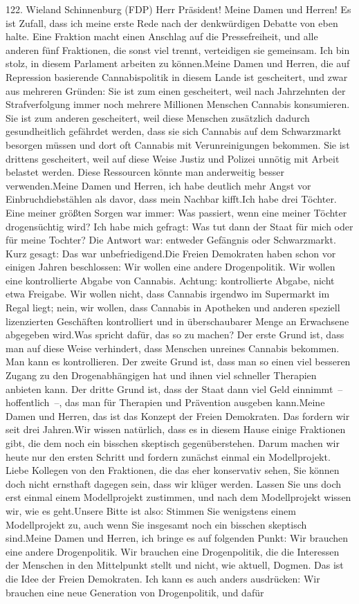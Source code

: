 \documentclass{article}
\begin{document}
	122. Wieland Schinnenburg (FDP) Herr Präsident! Meine Damen und Herren! Es ist Zufall, dass ich meine erste Rede nach der denkwürdigen Debatte von eben halte. Eine Fraktion macht einen Anschlag auf die Pressefreiheit, und alle anderen fünf Fraktionen, die sonst viel trennt, verteidigen sie gemeinsam. Ich bin stolz, in diesem Parlament arbeiten zu können.Meine Damen und Herren, die auf Repression basierende Cannabispolitik in diesem Lande ist gescheitert, und zwar aus mehreren Gründen: Sie ist zum einen gescheitert, weil nach Jahrzehnten der Strafverfolgung immer noch mehrere Millionen Menschen Cannabis konsumieren. Sie ist zum anderen gescheitert, weil diese Menschen zusätzlich dadurch gesundheitlich gefährdet werden, dass sie sich Cannabis auf dem Schwarzmarkt besorgen müssen und dort oft Cannabis mit Verunreinigungen bekommen. Sie ist drittens gescheitert, weil auf diese Weise Justiz und Polizei unnötig mit Arbeit belastet werden. Diese Ressourcen könnte man anderweitig besser verwenden.Meine Damen und Herren, ich habe deutlich mehr Angst vor Einbruchdiebstählen als davor, dass mein Nachbar kifft.Ich habe drei Töchter. Eine meiner größten Sorgen war immer: Was passiert, wenn eine meiner Töchter drogensüchtig wird? Ich habe mich gefragt: Was tut dann der Staat für mich oder für meine Tochter? Die Antwort war: entweder Gefängnis oder Schwarzmarkt. Kurz gesagt: Das war unbefriedigend.Die Freien Demokraten haben schon vor einigen Jahren beschlossen: Wir wollen eine andere Drogenpolitik. Wir wollen eine kontrollierte Abgabe von Cannabis. Achtung: kontrollierte Abgabe, nicht etwa Freigabe. Wir wollen nicht, dass Cannabis irgendwo im Supermarkt im Regal liegt; nein, wir wollen, dass Cannabis in Apotheken und anderen speziell lizenzierten Geschäften kontrolliert und in überschaubarer Menge an Erwachsene abgegeben wird.Was spricht dafür, das so zu machen? Der erste Grund ist, dass man auf diese Weise verhindert, dass Menschen unreines Cannabis bekommen. Man kann es kontrollieren. Der zweite Grund ist, dass man so einen viel besseren Zugang zu den Drogenabhängigen hat und ihnen viel schneller Therapien anbieten kann. Der dritte Grund ist, dass der Staat dann viel Geld einnimmt – hoffentlich –, das man für Therapien und Prävention ausgeben kann.Meine Damen und Herren, das ist das Konzept der Freien Demokraten. Das fordern wir seit drei Jahren.Wir wissen natürlich, dass es in diesem Hause einige Fraktionen gibt, die dem noch ein bisschen skeptisch gegenüberstehen. Darum machen wir heute nur den ersten Schritt und fordern zunächst einmal ein Modellprojekt. Liebe Kollegen von den Fraktionen, die das eher konservativ sehen, Sie können doch nicht ernsthaft dagegen sein, dass wir klüger werden. Lassen Sie uns doch erst einmal einem Modellprojekt zustimmen, und nach dem Modellprojekt wissen wir, wie es geht.Unsere Bitte ist also: Stimmen Sie wenigstens einem Modellprojekt zu, auch wenn Sie insgesamt noch ein bisschen skeptisch sind.Meine Damen und Herren, ich bringe es auf folgenden Punkt: Wir brauchen eine andere Drogenpolitik. Wir brauchen eine Drogenpolitik, die die Interessen der Menschen in den Mittelpunkt stellt und nicht, wie aktuell, Dogmen. Das ist die Idee der Freien Demokraten. Ich kann es auch anders ausdrücken: Wir brauchen eine neue Generation von Drogenpolitik, und dafür 
\end{document}
